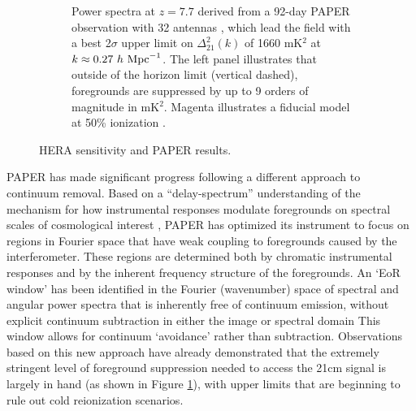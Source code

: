 \documentclass[preprint]{aastex}
\begin{document}
\begin{figure}[!ht]
\begin{subfigure}[b]{0.46\textwidth}
		\caption{
Power spectra at $z=7.7$ derived from a 92-day PAPER observation with 32 antennas \citep{parsons_et_al2012b},
which lead the field with a best
2$\sigma$ upper limit on $\Delta_{21}^2(k)$ of 1660 mK$^2$ at
$k\approx0.27\ h\ {\rm Mpc}^{-1}$.
The left panel illustrates that outside of the horizon limit (vertical dashed), foregrounds 
are suppressed by up to 9 orders of magnitude in mK$^2$.
Magenta illustrates a fiducial model at 50\% ionization \citep{lidz_et_al2008}.
}\label{fig:pk_k3pk}
	\end{subfigure}
\caption{HERA sensitivity and PAPER results.}
\label{fig:heraSensitivity}
\end{figure}

PAPER has made significant progress following a different approach to
continuum removal.  Based on a ``delay-spectrum'' understanding of
the mechanism for how instrumental responses modulate foregrounds on
spectral scales of cosmological interest \citep{parsons_et_al2012b},
PAPER has optimized its instrument to focus on regions in Fourier
space that have weak coupling to foregrounds caused by the
interferometer.  These regions are determined both by chromatic
instrumental responses and by the inherent frequency structure of the
foregrounds.  An `EoR window' has been identified in the Fourier
(wavenumber) space of spectral and angular power spectra that is
inherently free of continuum emission, without explicit continuum
subtraction in either the image or spectral domain \citep{pober_et_al2013,morales_et_al2012,Datta_2010}
This window allows for continuum
`avoidance' rather than subtraction. Observations based on this new
approach have already demonstrated that the extremely stringent level
of foreground suppression needed to access the 21cm signal is largely
in hand (as shown in Figure \ref{fig:pk_k3pk}), with upper limits
that are beginning to rule out cold reionization scenarios.
\end{document}
